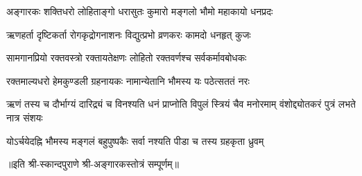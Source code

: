 

\twolineshloka
{अङ्गारकः शक्तिधरो लोहिताङ्गो धरासुतः}
{कुमारो मङ्गलो भौमो महाकायो धनप्रदः}

\twolineshloka
{ऋणहर्ता दृष्टिकर्ता रोगकृद्रोगनाशनः}
{विद्युत्प्रभो व्रणकरः कामदो धनहृत् कुजः}

\twolineshloka
{सामगानप्रियो रक्तवस्त्रो रक्तायतेक्षणः}
{लोहितो रक्तवर्णश्च सर्वकर्मावबोधकः}

\twolineshloka
{रक्तमाल्यधरो हेमकुण्डली ग्रहनायकः}
{नामान्येतानि भौमस्य यः पठेत्सततं नरः}

\threelineshloka
{ऋणं तस्य च दौर्भाग्यं दारिद्र्यं च विनश्यति}
{धनं प्राप्नोति विपुलं स्त्रियं चैव मनोरमाम्}
{वंशोद्द्योतकरं पुत्रं लभते नात्र संशयः}

\twolineshloka
{योऽर्चयेदह्नि भौमस्य मङ्गलं बहुपुष्पकैः}
{सर्वा नश्यति पीडा च तस्य ग्रहकृता ध्रुवम्}

॥इति श्री-स्कान्दपुराणे श्री-अङ्गारकस्तोत्रं सम्पूर्णम्॥